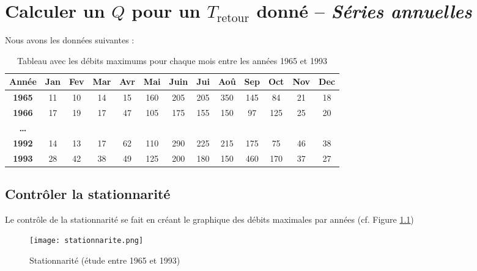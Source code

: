 \chapter{Calculer un $Q$ pour un $T_\text{retour}$ donné -- \textit{Séries annuelles}}


Nous avons les données suivantes :
\begin{table}[H]
    \centering
    \begin{tabular}{|c||c|c|c|c|c|c|c|c|c|c|c|c|}
        \hline
        \textbf{Année} & \textbf{Jan} & \textbf{Fev} & \textbf{Mar} & \textbf{Avr} & \textbf{Mai} & \textbf{Juin} & \textbf{Jui} & \textbf{Aoû} & \textbf{Sep} & \textbf{Oct} & \textbf{Nov} & \textbf{Dec} \\
        \hline \hline
        \textbf{1965}  & 11 & \cellcolor{green}10 & 14 & 15 & 160 & 205 & 205 & \cellcolor{red}350 & 145 &  84 &  21 & 18 \\
        \hline
        \textbf{1966}  & \cellcolor{green}17 & 19 & 17 & 47 & 105 & \cellcolor{red}175 & 155 & 150 &  97 & 125 &  25 & 20 \\
        \hline
        \textbf{\dots} &    &    &    &    &     &     &     &     &       &     &     &      \\
        \hline
        \textbf{1992}  & 14 & \cellcolor{green}13 & 17 & 62 & 110 & \cellcolor{red}290 & 225 & 215 & 175 &  75 &  46 & 38 \\
        \hline
        \textbf{1993}  & 28 & 42 & 38 & 49 & 125 & 200 & 180 & 150 & \cellcolor{red}460 & 170 &  37 & \cellcolor{green}27 \\
        \hline
    \end{tabular}
    \caption{Tableau avec les débits maximums pour chaque mois entre les années 1965 et 1993}
    \label{tab:seriesAnnuellesMaximum}
\end{table}


\section{Contrôler la stationnarité}
Le contrôle de la stationnarité se fait en créant le graphique des débits maximales par années (cf. Figure \ref{graph:stationnarite})
\begin{figure}[H]
    \centering
    \texttt{[image: stationnarite.png]}
    \caption{Stationnarité (étude entre 1965 et 1993)}
    \label{graph:stationnarite}
\end{figure}


